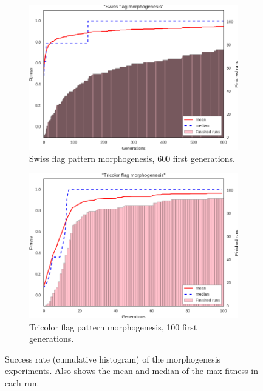 \begin{figure}[t]
\begin{subfigure}[t]{.45\columnwidth}
\includegraphics[width=\columnwidth]{fig/generate_swiss_results}
\caption{Swiss flag pattern morphogenesis, 600 first generations.}
\label{fig:generate_swiss_results}
\end{subfigure}
\begin{subfigure}[t]{.45\columnwidth}
\centering
\includegraphics[width=\columnwidth]{fig/generate_tricolor_results}
\caption{Tricolor flag pattern morphogenesis, 100 first generations.}
\label{fig:generate_tricolor_results}
\end{subfigure}
\caption{
    Success rate (cumulative histogram) of the morphogenesis experiments.
    Also shows the mean and median of the max fitness in each run.
    }
\label{fig:morphogenesis_results}
\end{figure}

